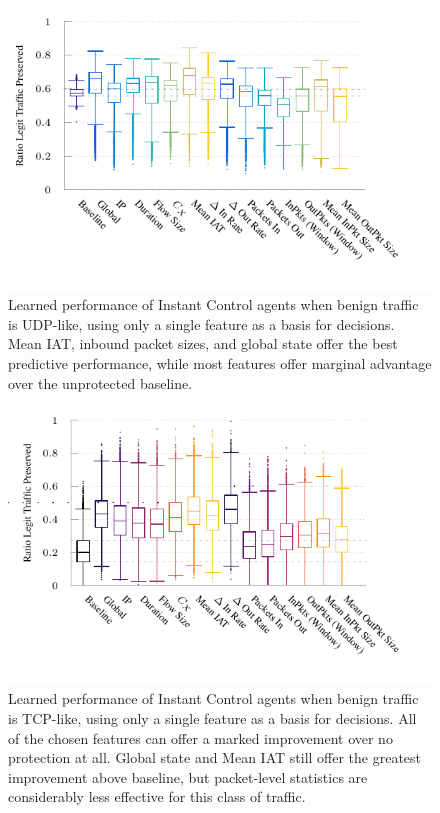 \begin{figure}
	\centering
	\includegraphics[width=0.65\linewidth]{plots/marl/ftprep-cap-box}
	\caption{
		Learned performance of Instant Control agents when benign traffic is UDP-like, using only a single feature as a basis for decisions.
		Mean IAT, inbound packet sizes, and global state offer the best predictive performance, while most features offer marginal advantage over the unprotected baseline.
		\label{fig:udp-feature-plots}
	}
\end{figure}


\begin{figure}
	\centering
	\includegraphics[width=0.65\linewidth]{plots/marl/ftprep-tcp-cap-box}
	\caption{
		Learned performance of Instant Control agents when benign traffic is TCP-like, using only a single feature as a basis for decisions.
		All of the chosen features can offer a marked improvement over no protection at all.
		Global state and Mean IAT still offer the greatest improvement above baseline, but packet-level statistics are considerably less effective for this class of traffic.
		\label{fig:tcp-cap-feature-plots}
	}
\end{figure}


